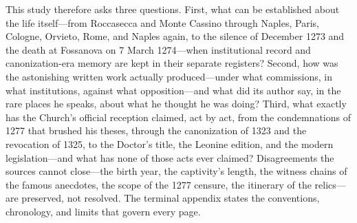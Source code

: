 This study therefore asks three questions. First, what can be established
about the life itself---from Roccasecca and Monte Cassino through Naples,
Paris, Cologne, Orvieto, Rome, and Naples again, to the silence of December
1273 and the death at Fossanova on 7 March 1274---when institutional record
and canonization-era memory are kept in their separate registers? Second,
how was the astonishing written work actually produced---under what
commissions, in what institutions, against what opposition---and what did
its author say, in the rare places he speaks, about what he thought he was
doing? Third, what exactly has the Church's official reception claimed, act
by act, from the condemnations of 1277 that brushed his theses, through the
canonization of 1323 and the revocation of 1325, to the Doctor's title, the
Leonine edition, and the modern legislation---and what has none of those
acts ever claimed? Disagreements the sources cannot close---the birth year,
the captivity's length, the witness chains of the famous anecdotes, the
scope of the 1277 censure, the itinerary of the relics---are preserved,
not resolved. The terminal appendix states the conventions, chronology,
and limits that govern every page.
